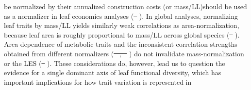 \documentclass[
  12pt,
  letterpaper,
  DIV=11,
  numbers=noendperiod]{scrartcl}
\providecommand{\DIFadd}[1]{{\protect\color{blue}\uwave{#1}}} %
\providecommand{\DIFdel}[1]{{\protect\color{red}\sout{#1}}}                      %
\providecommand{\DIFaddbegin}{} %
\providecommand{\DIFaddend}{} %
\providecommand{\DIFdelbegin}{} %
\providecommand{\DIFdelend}{} %
\newcommand{\DIFscaledelfig}{0.5}
\newlength{\DIFdelgraphicswidth} %
\newlength{\DIFdelgraphicsheight} %
\newcommand{\DIFaddincludegraphics}[2][]{{\color{blue}\fbox{\DIFOincludegraphics[#1]{#2}}}} %
\newcommand{\DIFdelincludegraphics}[2][]{%
\sbox{\DIFdelgraphicsbox}{\DIFOincludegraphics[#1]{#2}}%
\settoboxwidth{\DIFdelgraphicswidth}{\DIFdelgraphicsbox} %
\settoboxtotalheight{\DIFdelgraphicsheight}{\DIFdelgraphicsbox} %
\scalebox{\DIFscaledelfig}{%
\parbox[b]{\DIFdelgraphicswidth}{\usebox{\DIFdelgraphicsbox}\\[-\baselineskip] \rule{\DIFdelgraphicswidth}{0em}}\llap{\resizebox{\DIFdelgraphicswidth}{\DIFdelgraphicsheight}{%
\setlength{\unitlength}{\DIFdelgraphicswidth}%
\begin{picture}(1,1)%
\thicklines\linethickness{2pt} %
{\color[rgb]{1,0,0}\put(0,0){\framebox(1,1){}}}%
{\color[rgb]{1,0,0}\put(0,0){\line( 1,1){1}}}%
{\color[rgb]{1,0,0}\put(0,1){\line(1,-1){1}}}%
\end{picture}%
}\hspace*{3pt}}} %
} %
\DeclareRobustCommand{\DIFaddbegin}{\DIFOaddbegin \let\includegraphics\DIFaddincludegraphics} %
\DeclareRobustCommand{\DIFaddend}{\DIFOaddend \let\includegraphics\DIFOincludegraphics} %
\DeclareRobustCommand{\DIFdelbegin}{\DIFOdelbegin \let\includegraphics\DIFdelincludegraphics} %
\DeclareRobustCommand{\DIFdelend}{\DIFOaddend \let\includegraphics\DIFOincludegraphics} %
\begin{document}
be normalized by their annualized construction costs (or mass/LL)\DIFaddbegin \DIFadd{, which
}\DIFaddend should be used as a normalizer in leaf economics analyses
(\DIFdelbegin \DIFdel{\mbox{%
\citeproc{ref-Osnas2013}{Osnas et al. 2013}}\hspace{0pt}%
}\DIFdelend \DIFaddbegin \DIFadd{\mbox{%
\citeproc{ref-Osnas2013}{Osnas et al., 2013}}\hspace{0pt}%
}\DIFaddend ). In global analyses,
normalizing leaf traits by mass/LL yields similarly weak correlations as
area-normalization, because leaf area is roughly proportional to mass/LL
across global species (\DIFdelbegin \DIFdel{\mbox{%
\citeproc{ref-Osnas2013}{Osnas et al. 2013}}\hspace{0pt}%
}\DIFdelend \DIFaddbegin \DIFadd{\mbox{%
\citeproc{ref-Osnas2013}{Osnas et al., 2013}}\hspace{0pt}%
}\DIFaddend ).
Area-dependence of metabolic traits and the inconsistent correlation
strengths obtained from different normalizers
(\DIFdelbegin \DIFdel{\mbox{%
\citeproc{ref-Lloyd2013}{Lloyd et al. 2013}}\hspace{0pt}%
,
\mbox{%
\citeproc{ref-Osnas2013}{Osnas et al. 2013}}\hspace{0pt}%
}\DIFdelend \DIFaddbegin \DIFadd{\mbox{%
\citeproc{ref-Lloyd2013}{Lloyd et al., 2013}}\hspace{0pt}%
;
\mbox{%
\citeproc{ref-Osnas2013}{Osnas et al., 2013}}\hspace{0pt}%
}\DIFaddend ) do not invalidate
mass-normalization or the LES (\DIFdelbegin \DIFdel{\mbox{%
\citeproc{ref-Westoby2013}{Westoby et al.
2013}}\hspace{0pt}%
}\DIFdelend \DIFaddbegin \DIFadd{\mbox{%
\citeproc{ref-Westoby2013}{Westoby et
al., 2013}}\hspace{0pt}%
}\DIFaddend ). These considerations do, however, lead us to question the
evidence for a single dominant axis of leaf functional diversity, which
has important implications for how trait variation is represented in
\end{document}
